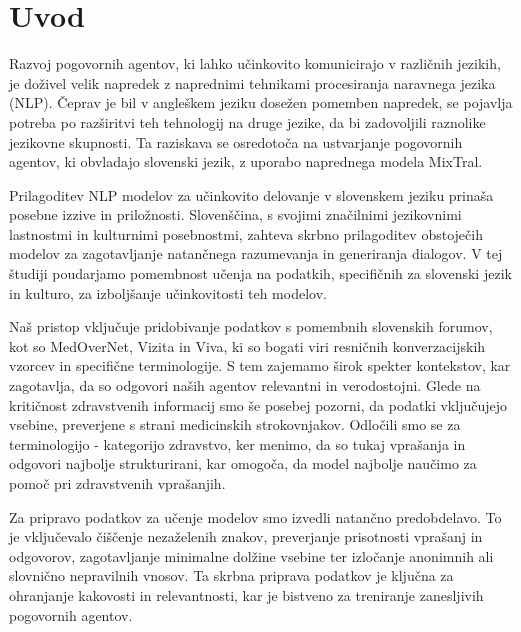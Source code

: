 \documentclass[fleqn,moreauthors,10pt]{ds_report}
\affiliation{\textit{Advisor: Slavko Žitnik}}
\begin{document}
\flushbottom 

\maketitle 

\thispagestyle{empty} 


\section*{Uvod}
Razvoj pogovornih agentov, ki lahko učinkovito komunicirajo v različnih jezikih, je doživel velik napredek z naprednimi tehnikami procesiranja naravnega jezika (NLP). Čeprav je bil v angleškem jeziku dosežen pomemben napredek, se pojavlja potreba po razširitvi teh tehnologij na druge jezike, da bi zadovoljili raznolike jezikovne skupnosti. Ta raziskava se osredotoča na ustvarjanje pogovornih agentov, ki obvladajo slovenski jezik, z uporabo naprednega modela MixTral.

Prilagoditev NLP modelov za učinkovito delovanje v slo\-ven\-ske\-m jeziku prinaša posebne izzive in priložnosti. Slo\-ven\-šči\-na, s svojimi značilnimi jezikovnimi lastnostmi in kulturnimi posebnostmi, zahteva skrbno prilagoditev obstoječih modelov za zagotavljanje natančnega razumevanja in generiranja dialogov. V tej študiji poudarjamo pomembnost učenja na podatkih, specifičnih za slovenski jezik in kulturo, za izboljšanje učinkovitosti teh modelov.

Naš pristop vključuje pridobivanje podatkov s pomembnih slovenskih forumov, kot so MedOverNet, Vizita in Viva, ki so bogati viri resničnih konverzacijskih vzorcev in specifične terminologije. S tem zajemamo širok spekter kontekstov, kar zagotavlja, da so odgovori naših agentov relevantni in verodostojni. Glede na kritičnost zdravstvenih informacij smo še posebej pozorni, da podatki vključujejo vsebine, preverjene s strani medicinskih strokovnjakov. Odločili smo se za terminologijo - kategorijo zdravstvo, ker menimo, da so tukaj vprašanja in odgovori najbolje strukturirani, kar omogoča, da model najbolje naučimo za pomoč pri zdravstvenih vprašanjih.

Za pripravo podatkov za učenje modelov smo izvedli natančno predobdelavo. To je vključevalo čiščenje ne\-za\-že\-le\-nih znakov, preverjanje prisotnosti vprašanj in odgovorov, zagotavljanje minimalne dolžine vsebine ter izločanje anonimnih ali slovnično nepravilnih vnosov. Ta skrbna priprava podatkov je ključna za ohranjanje kakovosti in relevantnosti, kar je bistveno za treniranje zanesljivih pogovornih agentov.
\end{document}
